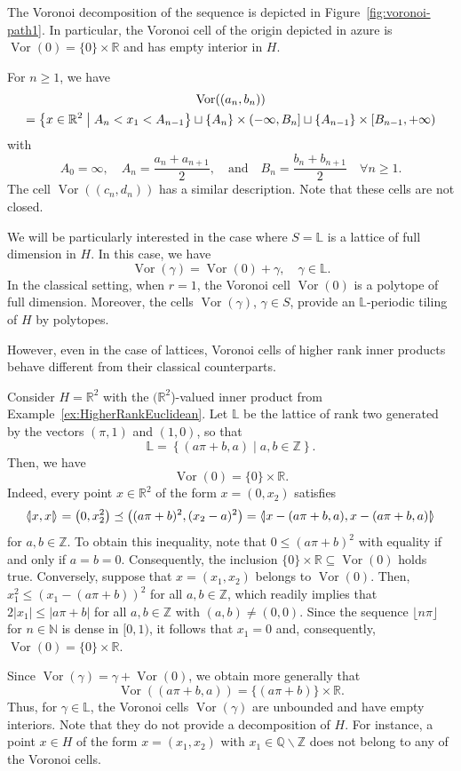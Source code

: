 \documentclass[AHL,Unicode,longabstracts]{cedram}
\newcommand{\llangle}{\mathopen{\langle\mkern -3.1mu\lvert}}
\newcommand{\rrangle}{\mathclose{\rvert\mkern -3.1mu\rangle}}
\newcommand{\highinn}[2]{{\llangle#2\rrangle_{#1}}}
\DeclareMathOperator{\Vor}{Vor}
\newcommand{\Q}{\mathbb{Q}}
\newcommand{\R}{\mathbb{R}}
\newcommand{\Z}{\mathbb{Z}}
\newcommand{\N}{\mathbb{N}}
\renewcommand{\L}{\mathbb{L}}
\renewcommand{\setminus}{\smallsetminus}
\let\oldforall\forall
\renewcommand*{\forall}{\mathrel{\oldforall}}
\begin{document}
\begin{exam}
The Voronoi decomposition of the sequence is depicted in Figure~\ref{fig:voronoi-path1}. In particular, the Voronoi cell of the origin depicted in azure is $\Vor(0) = \{0\}\times \R$ and has empty interior in $H$.

For $n \geq 1$, we have
\begin{multline*}
\Vor((a_n,b_n))\\ 
= \bigl\{ x \in \R^2 \bigm| A_n < x_1 < A_{n-1}\bigr\} \sqcup \{ A_n \} \times (-\infty, B_n] \sqcup \{ A_{n-1} \} \times [B_{n-1}, + \infty)
\end{multline*}
with
\[
A_0 =\infty, \quad A_n = \frac{a_n+a_{n+1}}2, \quad \text{and} \quad B_n= \frac{b_n + b_{n+1}}2\quad \forall n\geq 1.
\]
The cell $\Vor((c_n,d_n))$ has a similar description. Note that these cells are not closed.%
\end{exam}

We will be particularly interested in the case where $S=\L$ is a lattice of full dimension in $H$. In this case, we have
\[
\Vor(\gamma) = \Vor(0)+\gamma, \quad \gamma \in \L.
\]
In the classical setting, when $r=1$, the Voronoi cell $\Vor(0)$ is a polytope of full dimension. Moreover, the cells $\Vor(\gamma)$, $\gamma \in S$, provide an $\L$-periodic tiling of $H$ by polytopes.

However, even in the case of lattices, Voronoi cells of higher rank inner products behave different from their classical counterparts.


\begin{exam}\label{ex:pathology2}
Consider $H =\R^2$ with the $(\R^2$)-valued inner product from Example~\ref{ex:HigherRankEuclidean}. Let $\L$ be the lattice of rank two generated by the vectors $(\pi, 1)$ and $(1,0)$, so that
\[
\L= \left\{(a\pi+b, a)\mid a,b\in \Z\right\}.
\]
Then, we have
\[
\Vor(0) = \{0\}\times \R.
\]
Indeed, every point $x \in\R^2$ of the form $x = (0, x_2)$ satisfies
\[
\highinn{}{x, x} = \left(0, x_2^2\right) \preceq \left((a\pi+b)^2, (x_2 - a)^2\right) = \highinn{}{x - (a\pi +b, a), x - (a\pi +b, a)}
\]
for $a, b \in \Z$. To obtain this inequality, note that $0 \le (a\pi+b)^2$ with equality if and only if $a = b = 0$. Consequently, the inclusion $\{0\}\times \R \subseteq \Vor(0)$ holds true. Conversely, suppose that $x = (x_1, x_2)$ belongs to $\Vor(0)$. Then, $x_1^2 \le (x_1 - (a\pi +b))^2$ for all $a, b \in \Z$, which readily implies that $2 |x_1|\le |a \pi +b|$ for all $a, b \in \Z$ with $(a,b) \neq (0,0)$. Since the sequence $\lfloor n \pi \rfloor$ for $n \in \N$ is dense in $[0,1)$, it follows that $x_1 =0$ and, consequently, $\Vor(0) = \{0\}\times \R$.

Since $\Vor(\gamma) = \gamma +\Vor(0)$, we obtain more generally that
\[
\Vor\left((a\pi+b, a)\right) = \{(a\pi+b)\} \times \R.
\]
Thus, for $\gamma \in \L$, the Voronoi cells $\Vor(\gamma)$ are unbounded and have empty interiors. Note that they do not provide a decomposition of $H$. For instance, a point $x \in H$ of the form $x = (x_1, x_2)$ with $x_1 \in \Q \setminus \Z$ does not belong to any of the Voronoi cells.%
\end{exam}
\end{document}
